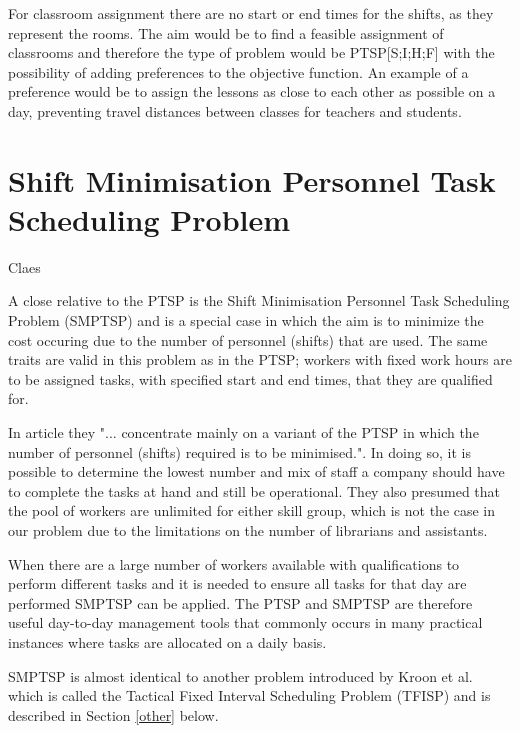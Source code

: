 For classroom assignment there are no start or end times for the shifts, as they represent the rooms. The aim would be to find a feasible assignment of classrooms and therefore the type of problem would be PTSP[S;I;H;F] with the possibility of adding preferences to the objective function. An example of a preference would be to assign the lessons as close to each other as possible on a day, preventing travel distances between classes for teachers and students.



%
%

\section{Shift Minimisation Personnel Task Scheduling Problem}\label{SMTSP}
Claes

A close relative to the PTSP is the Shift Minimisation Personnel Task Scheduling Problem (SMPTSP) and is a special case in which the aim is to minimize the cost occuring due to the number of personnel (shifts) that are used. The same traits are valid in this problem as in the PTSP; workers with fixed work hours are to be assigned tasks, with specified start and end times, that they are qualified for.

In article \cite{krishnamoorthy_2011} they "... concentrate mainly on a variant of the PTSP in which the number of personnel (shifts) required is to be minimised.". In doing so, it is possible to determine the lowest number and mix of staff a company should have to complete the tasks at hand and still be operational. They also presumed that the pool of workers are unlimited for either skill group, which is not the case in our problem due to the limitations on the number of librarians and assistants. 

When there are a large number of workers available with qualifications to perform different tasks and it is needed to ensure all tasks for that day are performed SMPTSP can be applied. The PTSP and SMPTSP are therefore useful day-to-day management tools that commonly occurs in many practical instances where tasks are allocated on a daily basis.

SMPTSP is almost identical to another problem introduced by Kroon et al. \cite{kroon_1997} which is called the Tactical Fixed Interval Scheduling Problem (TFISP) and is described in Section \ref{other} below.

